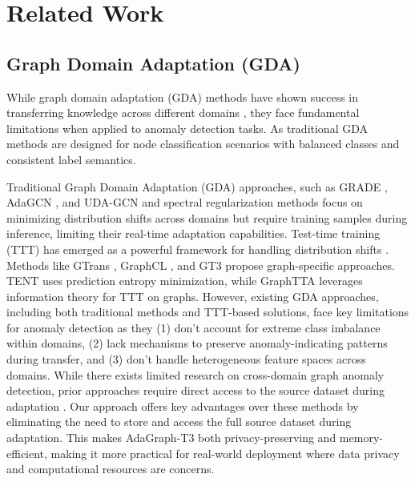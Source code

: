 \section{Related Work}
\subsection{Graph Domain Adaptation (GDA)}
While graph domain adaptation (GDA) methods have shown success in transferring knowledge across different domains \cite{shi2024graph}, they face fundamental limitations when applied to anomaly detection tasks. As traditional GDA methods are designed for node classification scenarios with balanced classes and consistent label semantics. 


Traditional Graph Domain Adaptation (GDA) approaches, such as GRADE \cite{wu2023non}, AdaGCN \cite{dai2022graph}, and UDA-GCN \cite{wu2020unsupervised} and spectral regularization methods \cite{you2023graph} focus on minimizing distribution shifts across domains but require training samples during inference, limiting their real-time adaptation capabilities. Test-time training (TTT) \cite{sun2020test} has emerged as a powerful framework for handling distribution shifts \cite{li2022out,wu2024graph,zhang2024fully}. Methods like GTrans \cite{jin2022empowering}, GraphCL \cite{you2020graph}, and GT3 \cite{wang2022test} propose graph-specific approaches. TENT \cite{wang2020tent}
uses prediction entropy minimization, while GraphTTA \cite{chen2022graphtta} leverages information theory for TTT on graphs. However, existing GDA approaches, including both traditional methods and TTT-based solutions, face key limitations for anomaly detection as they (1) don't account for extreme class imbalance within domains, (2) lack mechanisms to preserve anomaly-indicating patterns during transfer, and (3) don't handle heterogeneous feature spaces across domains. While there exists limited research on cross-domain graph anomaly detection, prior approaches require direct access to the source dataset during adaptation \cite{ding2021cross, wang2023cross}. Our approach offers key advantages over these methods by eliminating the need to store and access the full source dataset during adaptation. This makes AdaGraph-T3 both privacy-preserving and memory-efficient, making it more practical for real-world deployment where data privacy and computational resources are concerns.

